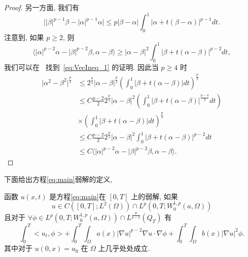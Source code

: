 \documentclass[oneside,longtitle]{LZUthesis}
\numberwithin{equation}{chapter}
\newcommand*\abs[1]{\lvert#1\rvert}
\begin{document}
\begin{proof}
	另一方面, 我们有
	\begin{equation*}
		\abs{\abs{\beta}^{p-1}\beta - \abs{\alpha}^{p-1}\alpha} \leq p\abs{\beta-\alpha}\int_0^1 \abs{\alpha + t(\beta - \alpha)}^{p-1}dt.
	\end{equation*}
	注意到, 如果 $p \geq 2$, 则
	\begin{equation}\label{eq:VecIneq_1}
		\langle \abs{\alpha}^{p-2}\alpha - \abs{\beta}^{p-2}\beta, \alpha-\beta\rangle
		\geq \abs{\alpha-\beta}^2\int_0^1 \abs{\beta + t(\alpha - \beta)}^{p-2}dt,
	\end{equation}
	我们可以在~\cite{lindqvistNotesStationaryPLaplace2019} 找到~\cref{eq:VecIneq_1} 的证明.
	因此当 $p \geq 4$ 时
	\begin{equation*}
		\begin{split}
			\abs{\alpha^2 - \beta^2}^{\frac{p}{2}}
			&\leq 2^{\frac{p}{2}}\abs{\alpha-\beta}^{\frac{p}{2}}
			\left(\int_0^1 \abs{\beta + t(\alpha - \beta)}dt\right)^{\frac{p}{2}}\\
			&\leq C\frac{p-2}{2}2^{\frac{p}{2}}\abs{\alpha-\beta}^2
			\left(\int_0^1 \abs{\beta + t(\alpha - \beta)}^{\frac{p-4}{2}}dt\right)\\
			&\times\left(\int_0^1 \abs{\beta + t(\alpha - \beta)}dt\right)^{\frac{p}{2}}\\
			&\leq C\frac{p-2}{2}2^{\frac{p}{2}}\abs{\alpha-\beta}^2
			\int_0^1 \abs{\beta + t(\alpha - \beta)}^{p-2}dt\\
			&\leq C \langle \abs{\alpha}^{p-2}\alpha - \abs{\beta}^{p-2}\beta, \alpha-\beta\rangle.
		\end{split}
	\end{equation*}
\end{proof}
下面给出方程\eqref{eq:main}弱解的定义,
\begin{definition}
	函数 $u(x, t)$ 是方程\eqref{eq:main}在 $[0, T]$ 上的弱解, 如果
	\begin{equation*}
		u \in C([0, T]; L^2(\Omega))\cap L^p(0, T; W_0^{1,p}(a,\Omega))
	\end{equation*}
	且对于 $\forall \phi \in L^p(0, T; W_0^{1,p}(a,\Omega))\cap L^{\frac{p}{p-2}}(Q_T)$ 有
	\begin{equation*}
		\int_0^T <u_t, \phi> + \int_0^T\int_\Omega a(x)\abs{\nabla u}^{p - 2}\nabla u \cdot \nabla \phi
		+ \int_0^T\int_\Omega b(x)\abs{\nabla u}^2\phi.
	\end{equation*}
	其中对于 $u(0, x) = u_0$ 在 $\Omega$ 上几乎处处成立.
\end{definition}
\end{document}
